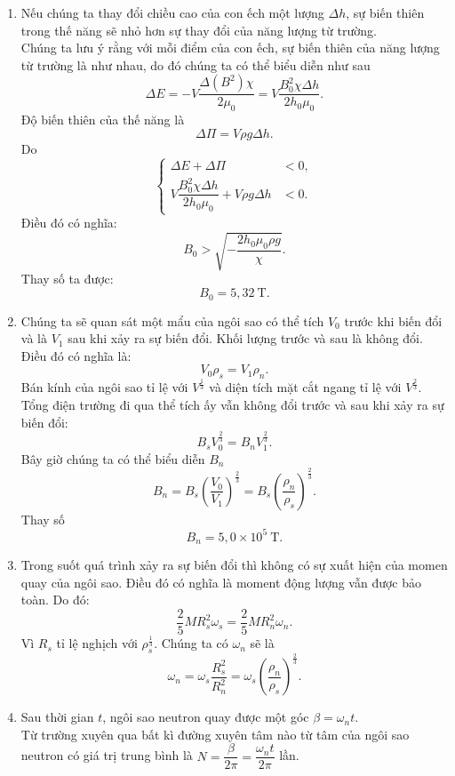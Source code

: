 \begin{loigiai}
\begin{enumerate}[1) ]
    \item Nếu chúng ta thay đổi chiều cao của con ếch một lượng $\Delta h$, sự biến thiên trong thế năng sẽ nhỏ hơn sự thay đổi của năng lượng từ trường.\\Chúng ta lưu ý rằng với mỗi điểm của con ếch, sự biến thiên của năng lượng từ trường là như nhau, do đó chúng ta có thể biểu diễn như sau
    \[\Delta E=-V\dfrac{\Delta(B^2)\chi}{2\mu_0}=V\dfrac{B_0^2\chi\Delta h}{2h_0\mu_0}.\]
    Độ biến thiên của thế năng là
    \[\Delta \Pi=V\rho g\Delta h. \]
    Do
    \[
    \begin{cases}
    \Delta E+\Delta \Pi &<0,\\
    V\dfrac{B_0^2\chi\Delta h}{2h_0\mu_0}+V\rho g\Delta h&<0.
    \end{cases}
    \]
    Điều đó có nghĩa:
    \[B_0>\sqrt{-\dfrac{2h_0\mu_0\rho g}{\chi}}.\]
    Thay số ta được:
    \[B_0=5,32~\mathrm{T}.\]
    \item Chúng ta sẽ quan sát một mẩu của ngôi sao có thể tích $V_0$ trước khi biến đổi và là $V_1$ sau khi xảy ra sự biến đổi. Khối lượng trước và sau là không đổi. Điều đó có nghĩa là:
    \[V_0\rho_{s}=V_1\rho_{n}.\]
    Bán kính của ngôi sao tỉ lệ với $V^{\frac{1}{3}}$ và diện tích mặt cắt ngang tỉ lệ với $V^{\frac{2}{3}}$.\\
    Tổng điện trường đi qua thể tích ấy vẫn không đổi trước và sau khi xảy ra sự biến đổi:
    \[B_{s}V_0^{\frac{2}{3}}=B_{n}V_1^{\frac{2}{3}}.\]
    Bây giờ chúng ta có thể biểu diễn $B_{n}$
    \[B_{n}=B_{s}\left(\dfrac{V_0}{V_1}\right)^{\frac{2}{3}}=B_{s}\left(\dfrac{\rho_{n}}{\rho_{s}}\right)^{\frac{2}{3}}.\]
    Thay số
    \[B_{n}=5,0\times10^5~\mathrm{T}.\]
    \item Trong suốt quá trình xảy ra sự biến đổi thì không có sự xuất hiện của momen quay của ngôi sao. Điều đó có nghĩa là moment động lượng vẫn được bảo toàn. Do đó:
    \[\dfrac{2}{5}MR^2_{s}\omega_{s}=\dfrac{2}{5}MR_{n}^2\omega_{n}.\]
    Vì $R_{s}$ tỉ lệ nghịch với $\rho_{s}^\frac{1}{3}$. Chúng ta có $\omega_{n}$ sẽ là
    \[\omega_{n}=\omega_{s}\dfrac{R_{s}^2}{R_{n}^2}=\omega_{s}\left(\dfrac{\rho_{n}}{\rho_{s}}\right)^{\frac{2}{3}}.\]
    \item Sau thời gian $t$, ngôi sao neutron quay được một góc $\beta=\omega_{n}t$.\\
    Từ trường xuyên qua bất kì đường xuyên tâm nào từ tâm của ngôi sao neutron có giá trị trung bình là $N=\dfrac{\beta}{2\pi}=\dfrac{\omega_{n}t}{2\pi}$ lần.\\

\end{enumerate}
\end{loigiai}
